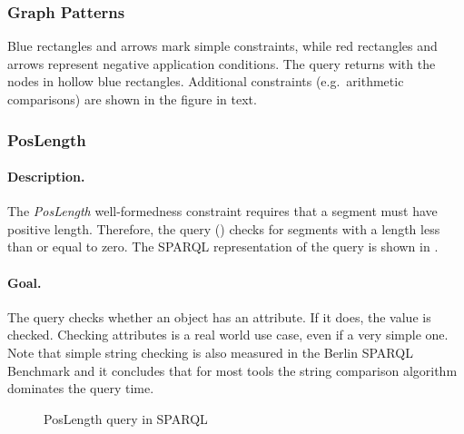 \subsubsection{Graph Patterns}

Blue rectangles and arrows mark simple constraints, while red rectangles and arrows represent negative application conditions. The query returns with the nodes in hollow blue rectangles. Additional constraints (e.g.\ arithmetic comparisons) are shown in the figure in text.


\subsubsection{PosLength}

\paragraph{Description.} The \textit{PosLength} well-formedness constraint requires that a segment must have positive length. Therefore, the query () checks for segments with a length less than or equal to zero. The SPARQL representation of the query is shown in .

\paragraph{Goal.} The query checks whether an object has an attribute. If it does, the value is checked. Checking attributes is a real world use case, even if a very simple one. Note that simple string checking is also measured in the Berlin SPARQL Benchmark \cite{BSBM} and it concludes that for most tools the string comparison algorithm dominates the query time.

\begin{figure}[Htb]
\centering
\begin{minipage}{0.5\textwidth}
  { \alignListing
    }
  \caption{PosLength query in SPARQL}
  \label{lst:poslength-sparql}
\end{minipage}
\end{figure}

% 
% 
% 
% 


